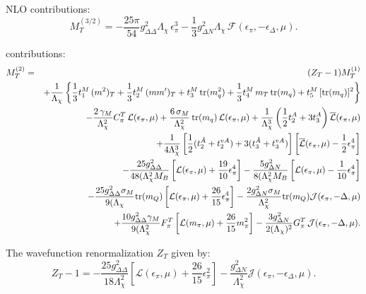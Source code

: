 \documentclass[12pt,tightenlines, raggedbottom, prd, notitlepage]{revtex4-1}
\def\tr{\text{tr}}
\def\c#1{{\mathcal #1}}
\def\ol#1{{\overline{#1}}}
\begin{document}
NLO contributions:
\begin{equation}
M^{(3/2)}_T = -\frac{25 \pi}{54} g_{\Delta\Delta}^2 \Lambda_\chi \, \epsilon_\pi^3 
- \frac{1}{3} g_{\Delta N}^2 \Lambda_\chi \, \c{F} (\epsilon_\pi,-\epsilon_\Delta,\mu)
.\label{eq:MNLO}
\end{equation}

 contributions:
\begin{eqnarray}
M_T^{(2)} &=& (Z_T - 1) M_T^{(1)} \notag \\ 
&& +
    \frac{1}{\Lambda_\chi} \left\{ \frac{1}{3} t_1^M \, (m^2)_T 
      + \frac{1}{3} t_2^M \, (m m')_T 
      + t_3^M \, \tr(m_q^2) 
      + \frac{1}{3} t_4^M \,  m_T  \, \tr (m_q)
      + t_5^M \, [\tr (m_q)]^2 \right\} \notag \\
&& -
    \frac{2 \,\gamma_M}{\Lambda_\chi^2}  C_\pi^T \, \c{L}(\epsilon_\pi,\mu) 
	+ \frac{6 \, \sigma_M}{\Lambda_\chi^2} \, \tr(m_q) \,
		\c{L}(\epsilon_\pi,\mu)
	+ \frac{1}{\Lambda_\chi^3} \left( 
		\frac{1}{2} t^A_2  + 3 t^A_3 \right)
		\ol{\c{L}} (\epsilon_\pi, \mu) \notag \\
	&&	+\frac{1}{4\Lambda_\chi^3} \left[ 
		\frac{1}{2} (t^{\tilde{A}}_2 + t_2^{vA}) 
		+ 3 (t^{\tilde{A}}_3  + t_3^{vA}) \right]
			\left[\ol{\c{L}} (\epsilon_\pi, \mu)
			- \frac{1}{2} \epsilon_\pi^4 \right] \notag \\
&& -
    \frac{25 g_{\Delta\Delta}^2}{48 (\Lambda_\chi^2 M_B} 
     \left[
       {\c{L}}(\epsilon_\pi,\mu) + \frac{19}{10} \epsilon_\pi^4 \right]
      - \frac{5 g_{\Delta N}^2}{8 (\Lambda_\chi^2 M_B}  
       \left[
         {\c{L}}(\epsilon_\pi,\mu) - \frac{1}{10} \epsilon_\pi^4 \right] \notag \\
&& -  
    \frac{25 g_{\Delta\Delta}^2 {\sigma_M}}{9 (\Lambda_\chi} \tr(m_Q)
     \left[ \c{L}(\epsilon_\pi,\mu) + \frac{26}{15} \epsilon_\pi^4 \right]
    - \frac{2 g_{\Delta N}^2 \sigma_M}{\Lambda_\chi^2} \tr(m_Q)
     \c{J} (\epsilon_\pi,-\Delta,\mu)\notag \\
&& +
    \frac{10 g_{\Delta\Delta}^2 \gamma_M}{9 (\Lambda_\chi^2} 
      F_\pi^T \left[ \c{L}(m_\pi,\mu) + \frac{26}{15} m_\pi^2 \right]
      - \frac{3 g_{\Delta N}^2 }{2 (\Lambda_\chi)^2} G_\pi^T  \, \c{J} (\epsilon_\pi,-\Delta,\mu)
\label{eq:MNNLO}
.\end{eqnarray}

The wavefunction renormalization $Z_T$ given by:
\begin{equation}
Z_T - 1 = - \frac{25 g_{\Delta\Delta}^2}{18 \Lambda_\chi^2} 
           \left[ \c{L}(\epsilon_\pi,\mu) + \frac{26}{15} \epsilon_\pi^2 \right]
          - \frac{g_{\Delta N}^2}{\Lambda_\chi^2} \c{J} (\epsilon_\pi,-\epsilon_\Delta,\mu)
\label{eq:Z}
.\end{equation}
\end{document}
